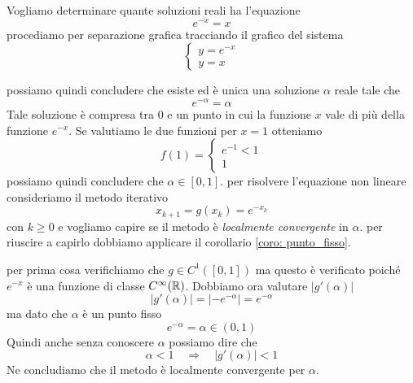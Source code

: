 \begin{example}
	Vogliamo determinare quante soluzioni reali ha l'equazione
	\[ e^{-x} = x \]
	procediamo per separazione grafica tracciando il grafico del sistema
	\[
		\begin{cases}
			y = e^{-x} \\
			y = x
		\end{cases}
	\]
	\begin{center}
	\end{center}
	possiamo quindi concludere che esiste ed è unica una soluzione $\alpha$ reale tale che
	\[ e^{-\alpha} = \alpha \]
	Tale soluzione è compresa tra 0 e un punto in cui la funzione $x$ vale di più della funzione $e^{-x}$.
	Se valutiamo le due funzioni per $x = 1$ otteniamo
	\[
		f(1) = \begin{cases}
			e^{-1} < 1 \\
			1
		\end{cases}
	\]
	possiamo quindi concludere che $\alpha \in [0, 1]$. per risolvere l'equazione non lineare consideriamo il
	metodo iterativo
	\[ x_{k+1} = g(x_k) = e^{-x_k} \]
	con $k \geq 0$ e vogliamo capire se il metodo è \emph{localmente convergente} in $\alpha$. per riuscire a
	capirlo dobbiamo applicare il corollario \ref{coro: punto_fisso}.

	per prima cosa verifichiamo che $g \in C^1([0, 1])$ ma questo è verificato poiché $e^{-x}$ è una funzione
	di classe $C^\infty(\mathbb{R})$. Dobbiamo ora valutare $|g'(\alpha)|$
	\[ |g'(\alpha)| = |-e^{-\alpha}| = e^{-\alpha} \]
	ma dato che $\alpha$ è un punto fisso
	\[ e^{-\alpha} = \alpha \in (0, 1) \]
	Quindi anche senza conoscere $\alpha$ possiamo dire che
	\[ \alpha < 1 \quad \Rightarrow \quad |g'(\alpha)| < 1\]
	Ne concludiamo che il metodo è localmente convergente per $\alpha$.


\end{example}
